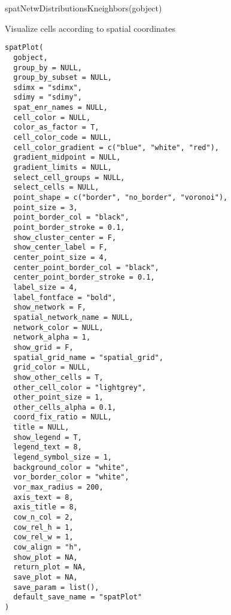 \documentclass[a4paper]{book}
\begin{document}
%
\begin{Examples}
\begin{ExampleCode}
    spatNetwDistributionsKneighbors(gobject)
\end{ExampleCode}
\end{Examples}
%
\begin{Description}\relax
Visualize cells according to spatial coordinates
\end{Description}
%
\begin{Usage}
\begin{verbatim}
spatPlot(
  gobject,
  group_by = NULL,
  group_by_subset = NULL,
  sdimx = "sdimx",
  sdimy = "sdimy",
  spat_enr_names = NULL,
  cell_color = NULL,
  color_as_factor = T,
  cell_color_code = NULL,
  cell_color_gradient = c("blue", "white", "red"),
  gradient_midpoint = NULL,
  gradient_limits = NULL,
  select_cell_groups = NULL,
  select_cells = NULL,
  point_shape = c("border", "no_border", "voronoi"),
  point_size = 3,
  point_border_col = "black",
  point_border_stroke = 0.1,
  show_cluster_center = F,
  show_center_label = F,
  center_point_size = 4,
  center_point_border_col = "black",
  center_point_border_stroke = 0.1,
  label_size = 4,
  label_fontface = "bold",
  show_network = F,
  spatial_network_name = NULL,
  network_color = NULL,
  network_alpha = 1,
  show_grid = F,
  spatial_grid_name = "spatial_grid",
  grid_color = NULL,
  show_other_cells = T,
  other_cell_color = "lightgrey",
  other_point_size = 1,
  other_cells_alpha = 0.1,
  coord_fix_ratio = NULL,
  title = NULL,
  show_legend = T,
  legend_text = 8,
  legend_symbol_size = 1,
  background_color = "white",
  vor_border_color = "white",
  vor_max_radius = 200,
  axis_text = 8,
  axis_title = 8,
  cow_n_col = 2,
  cow_rel_h = 1,
  cow_rel_w = 1,
  cow_align = "h",
  show_plot = NA,
  return_plot = NA,
  save_plot = NA,
  save_param = list(),
  default_save_name = "spatPlot"
)
\end{verbatim}
\end{Usage}
%
\end{document}
